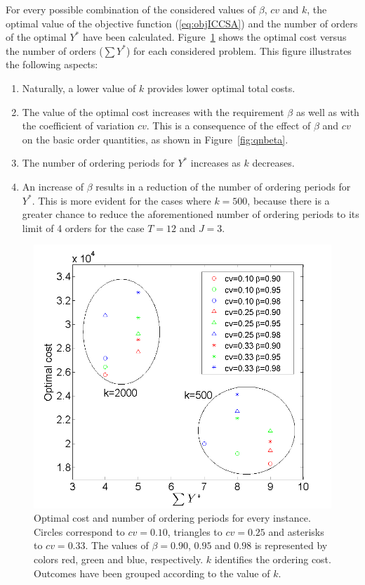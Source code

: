 {For every possible combination of the considered values of $\beta$, $cv$ and $k$, the optimal value of the objective function (\ref{eq:objICCSA}) and the number of orders of the optimal $Y^*$ have been calculated. Figure~\ref{fig:tests} shows the optimal cost  versus the number of orders ($\sum Y^*$) for each considered problem. This figure illustrates the following aspects:
\begin{enumerate}
	\item Naturally, a lower value of $k$ provides lower optimal total costs.
	\item The value of the optimal cost increases with the requirement $\beta$ as well as with the coefficient of variation $cv$. This is a consequence of the effect of $\beta$ and $cv$ on the basic order quantities, as shown in  Figure~\ref{fig:qnbeta}.
	\item The number of ordering periods  for $Y^*$ increases as $k$ decreases.
	\item An increase of $\beta$ results in a reduction of the number of ordering periods  for $Y^*$. This is more evident for the cases where $k=500$, because there is a greater chance to reduce the aforementioned number of ordering periods to its limit of 4 orders for the case $T=12$ and $J=3$.
\end{enumerate}


\begin{figure}[!ht]
\centering
\includegraphics[scale=0.5]{iccsa2015/figures/experimentos.png}
\caption{Optimal cost and number of ordering periods for every instance. Circles correspond to  $cv=0.10$, triangles to $cv=0.25$ and asterisks to $cv=0.33$. The values of $\beta=0.90$, $0.95$ and $0.98$ is represented by colors red, green and blue, respectively. $k$ identifies the ordering cost. Outcomes have been grouped according to the value of $k$.}
\label{fig:tests}
\end{figure}




}

